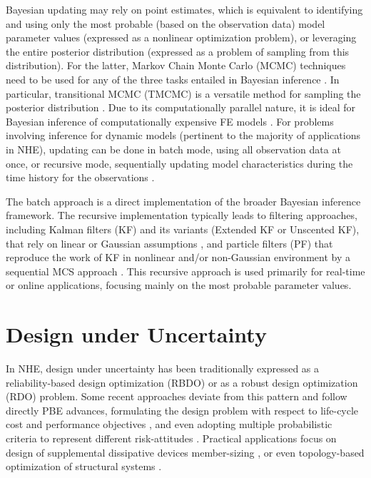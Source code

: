 Bayesian updating may rely on point estimates, which is equivalent to identifying and using only the most probable (based on the observation data) model parameter values (expressed as a nonlinear optimization problem), or leveraging the entire posterior distribution (expressed as a problem of sampling from this distribution). For the latter, Markov Chain Monte Carlo (MCMC) techniques need to be used for any of the three tasks entailed in Bayesian inference \citep{catanach2018bayesian}. In particular, transitional MCMC (TMCMC) is a versatile method for sampling the posterior distribution \citep{ching2007transitional, betz2016transitional}. Due to its computationally parallel nature, it is ideal for Bayesian inference of computationally expensive FE models \citep{ramancha2021bayesian, ramancha2021bayesianupdating}. For problems involving inference for dynamic models (pertinent to the majority of applications in NHE), updating can be done in batch mode, using all observation data at once, or recursive mode, sequentially updating model characteristics during the time history for the observations \citep{astroza2017batch, ramancha2021bayesianupdating}.

The batch approach is a direct implementation of the broader Bayesian inference framework. The recursive implementation typically leads to filtering approaches, including Kalman filters (KF) and its variants (Extended KF or Unscented KF), that rely on linear or Gaussian assumptions \citep{astroza2017batch, kontoroupi2017online, erazo2018bayesian}, and particle filters (PF) that reproduce the work of KF in nonlinear and/or non-Gaussian environment by a sequential MCS approach \citep{chatzi2009unscented, wei2013dynamic, olivier2017particle}. This recursive approach is used primarily for real-time or online applications, focusing mainly on the most probable parameter values. 

\section{Design under Uncertainty}
\label{sec:uq_design}

In NHE, design under uncertainty has been traditionally expressed as a reliability-based design optimization (RBDO) \citep{spence2012large, chun2019systemreliabilitybased} or as a robust design optimization (RDO) \citep{greco2015robust} problem. Some recent approaches deviate from this pattern and follow directly PBE advances, formulating the design problem with respect to life-cycle cost and performance objectives \citep{shin2014minimum}, and even adopting multiple probabilistic criteria to represent different risk-attitudes \citep{haukaas2012reliabilitybased, gidaris2017multiobjective, li2018probabilistic, deb2019simplified}. Practical applications focus on design of supplemental dissipative devices \citep{shin2014minimum, gidaris2017multiobjective, altieri2018reliabilitybased} member-sizing \citep{huang2015performancebased, suksuwan2018optimization}, or even  topology-based optimization of structural systems \citep{bobby2017reliabilitybased, zhu2017topology}.


